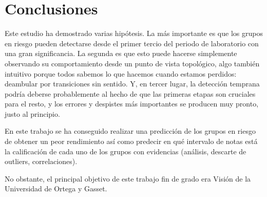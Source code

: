 \chapter{Conclusiones}\label{sec:chapterXIV}

Este estudio ha demostrado varias hipótesis. La más importante es que los grupos en riesgo pueden detectarse desde el primer tercio del periodo de laboratorio con una gran significancia. La segunda es que esto puede hacerse simplemente observando su comportamiento desde un punto de vista topológico, algo también intuitivo porque todos sabemos lo que hacemos cuando estamos perdidos: deambular por transiciones sin sentido. Y, en tercer lugar, la detección temprana podría deberse probablemente al hecho de que las primeras etapas son cruciales para el resto, y los errores y despistes más importantes se producen muy pronto, justo al principio.

En este trabajo se ha conseguido realizar una predicción de los grupos en riesgo de obtener un peor rendimiento así como predecir en qué intervalo de notas está la calificación de cada uno de los grupos con evidencias (análisis, descarte de outliers, correlaciones).

No obstante, el principal objetivo de este trabajo fin de grado era Visión de la Universidad de Ortega y Gasset.